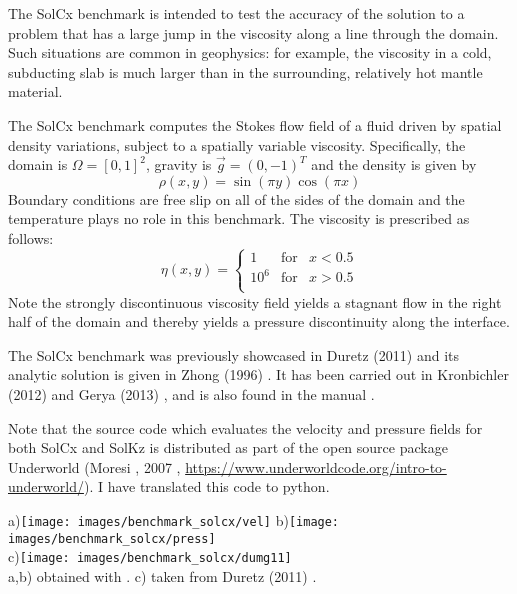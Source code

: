 
The SolCx benchmark is intended to test the accuracy of the solution to a problem that 
has a large jump in the viscosity along a line through the domain. Such situations are 
common in geophysics: for example, the viscosity in a cold, subducting slab is much larger 
than in the surrounding, relatively hot mantle material.

The SolCx benchmark computes the Stokes flow field of a fluid driven by spatial density 
variations, subject to a spatially variable viscosity. Specifically, the domain 
is $\Omega = [0,1]^2$, gravity is $\vec{g} = (0,-1)^T$ and the density is given by 
\begin{equation}
\rho(x,y) = \sin(\pi y) \cos(\pi x)
\end{equation}
Boundary conditions are free slip on all of the sides of the domain and the 
temperature plays no role in this benchmark. 
The viscosity is prescribed as follows:
\begin{equation}
\eta(x,y) = 
\left\{
\begin{array}{lll}
1 & \text{for} & x<0.5 \\
10^6 & \text{for} & x>0.5 \\
\end{array}
\right.
\end{equation}
Note the strongly discontinuous viscosity field yields a stagnant flow 
in the right half of the domain and thereby yields a pressure discontinuity along the interface. 

The SolCx benchmark was previously showcased in Duretz \etal (2011) \cite{dumg11} 
and its analytic solution is given in Zhong (1996) \cite{zhon96}. 
It has been carried out in Kronbichler \etal (2012) \cite{krhb12} and Gerya \etal (2013) \cite{gemd13}, 
and is also found in the \aspect manual \cite{aspectmanual}. 

Note that the source code which evaluates the velocity and pressure fields for both SolCx and SolKz is 
distributed as part of the open source package Underworld 
(Moresi \etal, 2007 \cite{moql07}, \url{https://www.underworldcode.org/intro-to-underworld/}).
I have translated this code to python. 

\begin{center}
a)\texttt{[image: images/benchmark\_solcx/vel]}
b)\texttt{[image: images/benchmark\_solcx/press]}\\
c)\texttt{[image: images/benchmark\_solcx/dumg11]}\\
{\captionfont a,b) obtained with \aspect. c) taken from Duretz \etal (2011) \cite{dumg11}.}
\end{center}

